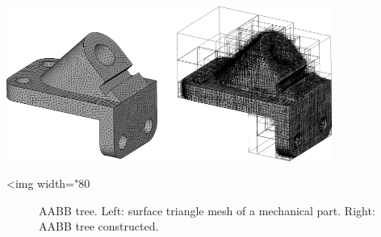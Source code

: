 \begin{center}
    \label{fig:AABB-tree-anchor}
    \begin{ccTexOnly}
      \includegraphics[width=0.8\textwidth]{AABB_tree/figs/anchor}
    \end{ccTexOnly}
    \begin{ccHtmlOnly}
        <img width="80%
    \end{ccHtmlOnly}
    \begin{figure}[h]
        \caption{AABB tree.
                 Left: surface triangle mesh of a mechanical part.
                 Right: AABB tree constructed.}
    \end{figure}
\end{center}


	
